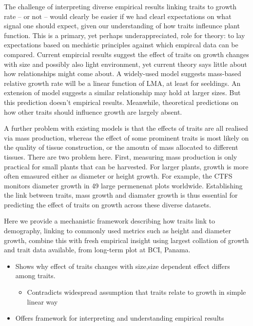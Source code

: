 \documentclass[12pt, a4paper]{article}
\begin{document}
The challenge of interpreting diverse empirical results linking traits to
growth rate -- or not -- would clearly be easier if we had clearl expectations
on what signal one should expect, given our understanding of how traits
infleunce plant function. This is a primary, yet perhaps underappreciated,
role for theory: to lay expectations based on mechistic principles against
which empircal data can be compared. Current empircial results suggest the
effect of traits on growth changes with size and possibly also light
environment, yet current theory says little about how relationships might come
about. A widely-used model suggests mass-based relative growth rate will be a
linear function of LMA, at least for seeldings.  An extension of model
suggests a similar relationship may hold at larger sizes. But this prediction
doesn't empirical results. Meanwhile, theoretical predictions on how other
traits should influence growth are largely absent.

A further problem with existing models is that the effects of traits are all
realised via mass production, whereas the effect of some prominent traits is
most likely on the quality of tissue construction, or the amoutn of mass
allocated to different tissues. There are two problem here. First, measuring mass
production is only practical for small plants that can be harvested. For larger plants,
growth is more often emasured either as diameter or height growth. For example, the
CTFS monitors diameter growth in 49 large permenenat plots worldwide. Establishing
the link between traits, mass growth and diamater growth is thus essential for predicting
the effect of traits on growth across these diverse datasets.

Here we provide a mechanistic framework describing how traits link to
demography, linking to commonly used metrics such as height and diameter
growth, combine this with fresh empirical insight using largest
collation of growth and trait data available, from long-term plot at
BCI, Panama.

\begin{itemize}
\itemsep1pt\parskip0pt
\item
  Shows why effect of traits changes with size,size dependent effect
  differs among traits.

  \begin{itemize}
  \itemsep1pt\parskip0pt
  \item
    Contradicts widespread assumption that traits relate to growth in
    simple linear way
  \end{itemize}
\item
  Offers framework for interpreting and understanding empirical results
\end{itemize}
\end{document}
